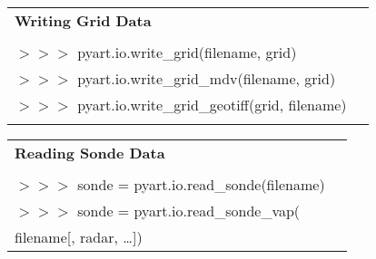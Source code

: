 \documentclass[potrait, z1paper, fontscale=0.33]{baposter} %
\begin{document}
\begin{poster}
{\begin{flushleft}
\begin{tabular}{@{}ll@{}}
\multicolumn{2}{l}{\cellcolor[HTML]{DDFFFF}\bf Writing Grid Data} \\
\\
$>$$>$$>$ pyart.io.write\_grid(filename, grid)\\
$>$$>$$>$ pyart.io.write\_grid\_mdv(filename, grid)\\
$>$$>$$>$ pyart.io.write\_grid\_geotiff(grid, filename)\\
\\
\end{tabular}

\begin{tabular}{@{}ll@{}}
\multicolumn{2}{l}{\cellcolor[HTML]{DDFFFF}\bf Reading Sonde Data} \\
\\
$>$$>$$>$ sonde = pyart.io.read\_sonde(filename)\\
$>$$>$$>$ sonde = pyart.io.read\_sonde\_vap(\\
\-\hspace{1.5cm} filename[, radar, …])\\

\end{tabular}
\end{flushleft}

}



\end{poster}
\end{document}
